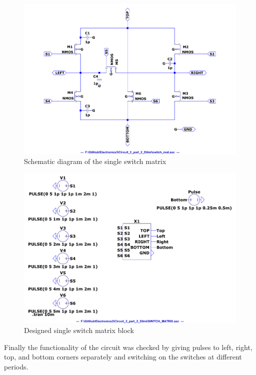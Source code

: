 \documentclass[a4paper,11pt]{article}%
\begin{document}
\begin{figure}[H]
	\centering
	\includegraphics[scale=0.5]{figures/2part2/switch_mat.pdf}
	\caption{Schematic diagram of the single switch matrix}
\end{figure}
\begin{figure}[H]
	\centering
	\includegraphics[scale=0.4]{figures/2part2/block.pdf}
	\caption{Designed single switch matrix block}
\end{figure}

Finally the functionality of the circuit was checked by giving pulses to left, right, top, and bottom corners separately and switching on the switches at different periods.
\end{document}
